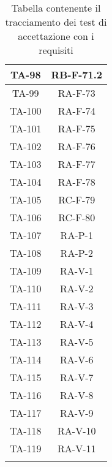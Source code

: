 \begin{center}
\begin{longtable}{|c|c|}
			\hline
			TA-98 & RB-F-71.2 \\
			\hline
			TA-99 & RA-F-73 \\
			\hline
			TA-100 & RA-F-74 \\
			\hline
			TA-101 & RA-F-75 \\
			\hline
			TA-102 & RA-F-76 \\
			\hline
			TA-103 & RA-F-77 \\
			\hline
			TA-104 & RA-F-78 \\
			\hline
			TA-105 & RC-F-79 \\
			\hline
			TA-106 & RC-F-80 \\
			\hline
			TA-107 & RA-P-1 \\
			\hline
			TA-108 & RA-P-2 \\
			\hline
			TA-109 & RA-V-1 \\
			\hline
			TA-110 & RA-V-2 \\
			\hline
			TA-111 & RA-V-3 \\
			\hline
			TA-112 & RA-V-4 \\
			\hline
			TA-113 & RA-V-5 \\
			\hline
			TA-114 & RA-V-6 \\
			\hline
			TA-115 & RA-V-7 \\
			\hline
			TA-116 & RA-V-8 \\
			\hline
			TA-117 & RA-V-9 \\
			\hline
			TA-118 & RA-V-10 \\
			\hline
			TA-119 & RA-V-11 \\
			\hline

			\caption{Tabella contenente il tracciamento dei test di accettazione con i requisiti}
			\end{longtable}
		\end{center}
\newpage
